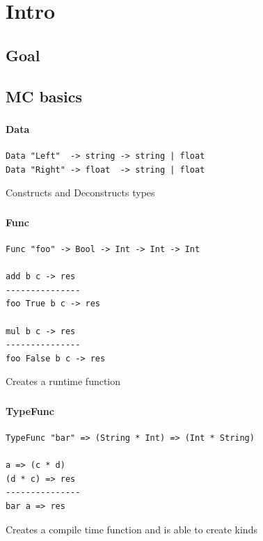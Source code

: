 \section{Intro}
\subsection{Goal}

\subsection{MC basics}

\begin{frame}[fragile]
   \frametitle{\subsecname}
   \framesubtitle{Data}

   \begin{lstlisting}
Data "Left"  -> string -> string | float
Data "Right" -> float  -> string | float
   \end{lstlisting}
   Constructs and Deconstructs types
\end{frame}

\begin{frame}[fragile]
   \frametitle{\subsecname}
   \framesubtitle{Func}

   \begin{lstlisting}
Func "foo" -> Bool -> Int -> Int -> Int

add b c -> res
---------------
foo True b c -> res

mul b c -> res
---------------
foo False b c -> res
   \end{lstlisting}
   Creates a runtime function
\end{frame}

\begin{frame}[fragile]
   \frametitle{\subsecname}
   \framesubtitle{TypeFunc}

   \begin{lstlisting}
TypeFunc "bar" => (String * Int) => (Int * String)

a => (c * d)
(d * c) => res
---------------
bar a => res
   \end{lstlisting}
   Creates a compile time function and is able to create kinds
\end{frame}

